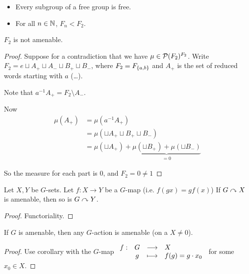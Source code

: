     \begin{theorem}
        \begin{itemize}
            \item Every subgroup of a free group is free.
            \item For all $n \in \mathbb N$, $F_n < F_2$.
        \end{itemize}
    \end{theorem}

    \begin{theorem}
        $F_2$ is not amenable.
    \end{theorem}
    
    \begin{proof}
        Suppose for a contradiction that we have $\mu \in \mathcal{P}(F_2)^{F_2}$.
        Write $F_2 = {e} \sqcup A_+ \sqcup A_- \sqcup B_+ \sqcup B_-$, 
        where $F_2 = F_{\left\{ a, b \right\}}$ and $A_+$ is the set of reduced words 
        starting with $a$ (\dots).

        Note that $a^{-1} A_+ = F_2 \setminus A_-$.

        Now \begin{align*}
            \mu(A_+) 
            &= \mu(a^{-1}A_+)
            \\&= \mu(\sqcup A_+ \sqcup B_+ \sqcup B_-)
            \\&= \mu(\sqcup A_+) + 
                \underbrace{
                    \mu(\sqcup B_+) + \mu(\sqcup B_-) 
                }_{=0}
        \end{align*}

        So the measure for each part is 0, and $F_2 = 0 \neq 1$
    \end{proof}

    \begin{lemma}
        Let $X, Y$ be $G$-sets. Let $f: X \to Y$ be a $G$-map (i.e. $f(gx) = gf(x)$)
        If $G \curvearrowright X$ is amenable, then so is $G \curvearrowright Y$.
    \end{lemma}

    \begin{proof}
        Functoriality.
    \end{proof}

    \begin{corollary}
        If $G$ is amenable, then any $G$-action is amenable
        (on a $X \neq 0$).
    \end{corollary}

    \begin{proof}
        Use corollary with the $G$-map $\begin{array}{rccl} f : & G & \longrightarrow & X \\ & g & \longmapsto & f(g) = g \cdot x_0 \end{array}$
         for some $x_0 \in X$.
    \end{proof}


